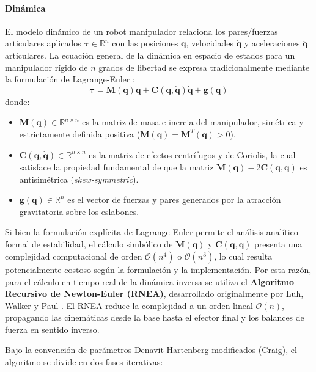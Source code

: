 \documentclass[12pt]{article}
\begin{document}
\paragraph{Dinámica}
\label{sssec:dinamica_robots}
El modelo dinámico de un robot manipulador relaciona los pares/fuerzas articulares aplicados $\bm{\tau} \in \mathbb{R}^n$ con las posiciones $\bm{q}$, velocidades $\dot{\bm{q}}$ y aceleraciones $\ddot{\bm{q}}$ articulares. La ecuación general de la dinámica en espacio de estados para un manipulador rígido de $n$ grados de libertad se expresa tradicionalmente mediante la formulación de Lagrange-Euler \cite{Spong, modern_robotics}:
\begin{equation}
\bm{\tau} = \bm{M}(\bm{q})\ddot{\bm{q}} + \bm{C}(\bm{q},\dot{\bm{q}})\dot{\bm{q}} + \bm{g}(\bm{q})
\label{eq:dinamica_robot}
\end{equation}
donde:
\begin{itemize}
    \item $\bm{M}(\bm{q}) \in \mathbb{R}^{n \times n}$ es la matriz de masa e inercia del manipulador, simétrica y estrictamente definida positiva ($\bm{M}(\bm{q}) = \bm{M}^T(\bm{q}) > 0$).
    \item $\bm{C}(\bm{q},\dot{\bm{q}}) \in \mathbb{R}^{n \times n}$ es la matriz de efectos centrífugos y de Coriolis, la cual satisface la propiedad fundamental de que la matriz $\dot{\bm{M}}(\bm{q}) - 2\bm{C}(\bm{q},\dot{\bm{q}})$ es antisimétrica (\textit{skew-symmetric}).
    \item $\bm{g}(\bm{q}) \in \mathbb{R}^n$ es el vector de fuerzas y pares generados por la atracción gravitatoria sobre los eslabones.
\end{itemize}

Si bien la formulación explícita de Lagrange-Euler permite el análisis analítico formal de estabilidad, el cálculo simbólico de $\bm{M}(\bm{q})$ y $\bm{C}(\bm{q},\dot{\bm{q}})$ presenta una complejidad computacional de orden $\mathcal{O}(n^4)$ o $\mathcal{O}(n^3)$, lo cual resulta potencialmente costoso según la formulación y la implementación. Por esta razón, para el cálculo en tiempo real de la dinámica inversa se utiliza el \textbf{Algoritmo Recursivo de Newton-Euler (RNEA)}, desarrollado originalmente por Luh, Walker y Paul \cite{modern_robotics, Spong}. El RNEA reduce la complejidad a un orden lineal $\mathcal{O}(n)$, propagando las cinemáticas desde la base hasta el efector final y los balances de fuerza en sentido inverso.

Bajo la convención de parámetros Denavit-Hartenberg modificados (Craig), el algoritmo se divide en dos fases iterativas:
\end{document}
